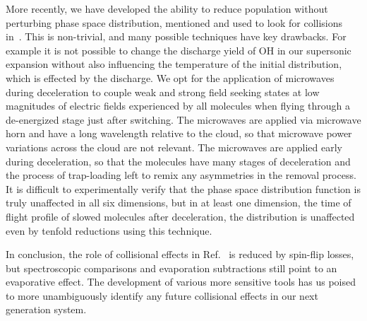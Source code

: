 \documentclass[%
 reprint,
 amsmath,amssymb,
 aps,
pra,
]{revtex4-1}
\begin{document}
More recently, we have developed the ability to reduce population without perturbing phase space distribution, mentioned and used to look for collisions in~\cite{smt}.
This is non-trivial, and many possible techniques have key drawbacks. 
For example it is not possible to change the discharge yield of OH in our supersonic expansion without also influencing the temperature of the initial distribution, which is effected by the discharge.
We opt for the application of microwaves during deceleration to couple weak and strong field seeking states at low magnitudes of electric fields experienced by all molecules when flying through a de-energized stage just after switching.
The microwaves are applied via microwave horn and have a long wavelength relative to the cloud, so that microwave power variations across the cloud are not relevant.
The microwaves are applied early during deceleration, so that the molecules have many stages of deceleration and the process of trap-loading left to remix any asymmetries in the removal process.
It is difficult to experimentally verify that the phase space distribution function is truly unaffected in all six dimensions, but in at least one dimension, the time of flight profile of slowed molecules after deceleration, the distribution is unaffected even by tenfold reductions using this technique.


In conclusion, the role of collisional effects in Ref.~\cite{Stuhl2013} is reduced by spin-flip losses,
but spectroscopic comparisons and evaporation subtractions still point to an evaporative effect. 
The development of various more sensitive tools has us poised to more unambiguously identify any future collisional effects in our next generation system.
\end{document}
